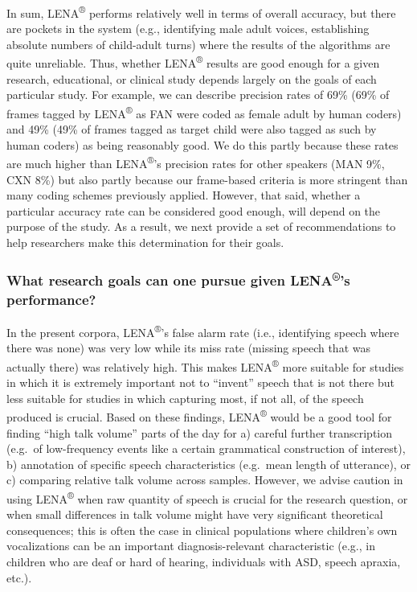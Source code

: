 \documentclass[english,table,man,floatsintext]{apa6}
\begin{document}
In sum, LENA\textsuperscript{®} performs relatively well in terms of overall accuracy, but there are pockets in the system (e.g., identifying male adult voices, establishing absolute numbers of child-adult turns) where the results of the algorithms are quite unreliable. Thus, whether LENA\textsuperscript{®} results are good enough for a given research, educational, or clinical study depends largely on the goals of each particular study. For example, we can describe precision rates of 69\% (69\% of frames tagged by LENA\textsuperscript{®} as FAN were coded as female adult by human coders) and 49\% (49\% of frames tagged as target child were also tagged as such by human coders) as being reasonably good. We do this partly because these rates are much higher than LENA\textsuperscript{®}'s precision rates for other speakers (MAN 9\%, CXN 8\%) but also partly because our frame-based criteria is more stringent than many coding schemes previously applied. However, that said, whether a particular accuracy rate can be considered good enough, will depend on the purpose of the study. As a result, we next provide a set of recommendations to help researchers make this determination for their goals.

\hypertarget{what-research-goals-can-one-pursue-given-lenas-performance}{%
\subsubsection{\texorpdfstring{What research goals can one pursue given LENA\textsuperscript{®}'s performance?}{What research goals can one pursue given LENA®'s performance?}}\label{what-research-goals-can-one-pursue-given-lenas-performance}}

In the present corpora, LENA\textsuperscript{®}'s false alarm rate (i.e., identifying speech where there was none) was very low while its miss rate (missing speech that was actually there) was relatively high. This makes LENA\textsuperscript{®} more suitable for studies in which it is extremely important not to \enquote{invent} speech that is not there but less suitable for studies in which capturing most, if not all, of the speech produced is crucial. Based on these findings, LENA\textsuperscript{®} would be a good tool for finding \enquote{high talk volume} parts of the day for a) careful further transcription (e.g.~of low-frequency events like a certain grammatical construction of interest), b) annotation of specific speech characteristics (e.g.~mean length of utterance), or c) comparing relative talk volume across samples. However, we advise caution in using LENA\textsuperscript{®} when raw quantity of speech is crucial for the research question, or when small differences in talk volume might have very significant theoretical consequences; this is often the case in clinical populations where children's own vocalizations can be an important diagnosis-relevant characteristic (e.g., in children who are deaf or hard of hearing, individuals with ASD, speech apraxia, etc.).
\end{document}
